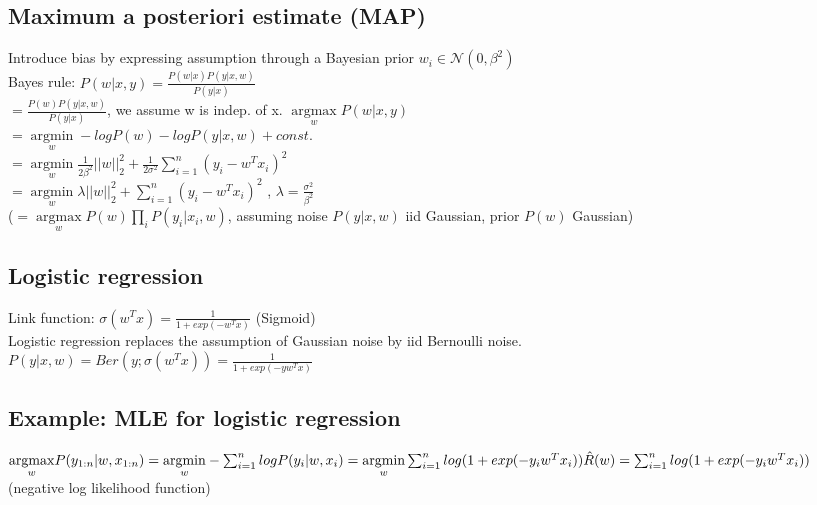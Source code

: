 \subsection*{Maximum a posteriori estimate (MAP)}
Introduce bias by expressing assumption through a Bayesian prior $w_i \in \mathcal{N}(0, \beta^2)$\\
Bayes rule: $P(w|x,y) = \frac{P(w|x) P(y|x,w)}{P(y|x)}$\\
$ = \frac{P(w) P(y|x,w)}{P(y|x)}$, we assume w is indep. of x.
$ \underset{w}{\operatorname{argmax}} P(w|x,y)$\\ 
$= \underset{w}{\operatorname{argmin}} - log P(w) - log P(y|x,w) + const.$ \\
$= \underset{w}{\operatorname{argmin}} \frac{1}{2\beta^2} ||w||_2^2 + \frac{1}{2\sigma^2} \sum_{i=1}^n (y_i - w^Tx_i)^2$ \\
$= \underset{w}{\operatorname{argmin}} \lambda ||w||_2^2 + \sum_{i=1}^n (y_i - w^Tx_i)^2$ , $\lambda = \frac{\sigma^2}{\beta^2}$\\
($=\underset{w}{\operatorname{argmax}} P(w) \prod_i P(y_i|x_i,w)$, assuming noise $P(y|x,w)$ iid Gaussian, prior $P(w)$ Gaussian)

\subsection*{Logistic regression}
Link function: $\sigma(w^Tx) = \frac{1}{1+exp(-w^Tx)}$ (Sigmoid)\\
Logistic regression replaces the assumption of Gaussian noise by iid Bernoulli noise.\\
$P(y|x,w) = Ber(y; \sigma(w^Tx)) = \frac{1}{1+exp(-y w^T x)}$\\

\subsection*{Example: MLE for logistic regression}
$\underset{w}{\operatorname{argmax}} P(y_{1:n}|w,x_{1:n})\\
= \underset{w}{\operatorname{argmin}} - \sum_{i=1}^n log P(y_i|w,x_i)\\
= \underset{w}{\operatorname{argmin}} \sum_{i=1}^n log(1+exp(-y_i w^T x_i))\\
\hat{R}(w) = \sum_{i=1}^n log(1+exp(-y_i w^T x_i))$ (negative log likelihood function)

